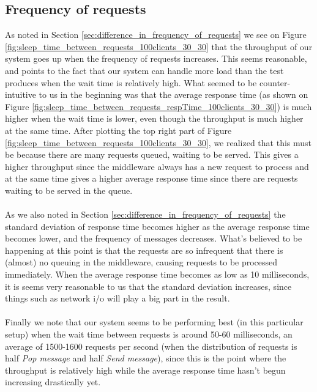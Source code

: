 \documentclass{article}
\begin{document}
        \subsection{Frequency of requests}
            \label{sec:frequency_of_requests}
            As noted in Section \ref{sec:difference_in_frequency_of_requests} we see on Figure \ref{fig:sleep_time_between_requests_100clients_30_30} that the throughput of our system goes up when the frequency of requests increases. This seems reasonable, and points to the fact that our system can handle more load than the test produces when the wait time is relatively high. What seemed to be counter-intuitive to us in the beginning was that the average response time (as shown on Figure \ref{fig:sleep_time_between_requests_respTime_100clients_30_30}) is much higher when the wait time is lower, even though the throughput is much higher at the same time. After plotting the top right part of Figure \ref{fig:sleep_time_between_requests_100clients_30_30}, we realized that this must be because there are many requests queued, waiting to be served. This gives a higher throughput since the middleware always has a new request to process and at the same time gives a higher average response time since there are requests waiting to be served in the queue.\\
            \\
            As we also noted in Section \ref{sec:difference_in_frequency_of_requests} the standard deviation of response time becomes higher as the average response time becomes lower, and the frequency of messages decreases. What's believed to be happening at this point is that the requests are so infrequent that there is (almost) no queuing in the middleware, causing requests to be processed immediately. When the average response time becomes as low as 10 milliseconds, it is seems very reasonable to us that the standard deviation increases, since things such as network i/o will play a big part in the result.\\
            \\
            Finally we note that our system seems to be performing best (in this particular setup) when the wait time between requests is around 50-60 milliseconds, an average of 1500-1600 requests per second (when the distribution of requests is half \textit{Pop message} and half \textit{Send message}), since this is the point where the throughput is relatively high while the average response time hasn't begun increasing drastically yet.
\end{document}

